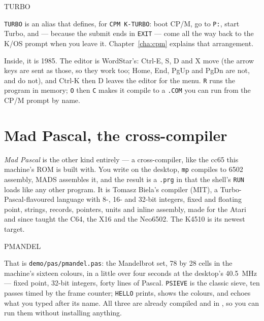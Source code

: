 \begin{type}
TURBO
\end{type}

\noindent \verb|TURBO| is an alias that 
defines, for \verb|CPM K-TURBO|: boot CP/M, go to \verb|P:|, start Turbo,
and --- because the submit ends in \verb|EXIT| --- come all the way back
to the K/OS prompt when you leave it. Chapter~\ref{cha:cpm} explains
that arrangement.


Inside, it is 1985. The editor is WordStar's: Ctrl-E, S, D and X move
(the arrow keys are sent as those, so they work too; Home, End, PgUp and
PgDn are not, and do not), and Ctrl-K then D leaves the editor for the
menu. \verb|R| runs the program in memory;
\verb|O| then \verb|C| makes it compile to a \texttt{.COM} you can run
from the CP/M prompt by name.

\section{Mad Pascal, the cross-compiler}
\emph{Mad Pascal} is the other kind entirely --- a cross-compiler, like
the cc65 this machine's ROM is built with. You write on the desktop,
\texttt{mp} compiles to 6502 assembly, MADS assembles it, and the result
is a \texttt{.prg} in  that the shell's \verb|RUN| loads like
any other program. It is Tomasz Biela's compiler (MIT), a
Turbo-Pascal-flavoured language with 8-, 16- and 32-bit integers, fixed
and floating point, strings, records, pointers, units and inline
assembly, made for the Atari and since taught the C64, the X16 and the
Neo6502. The K4510 is its newest target.

\begin{type}
PMANDEL
\end{type}


That is \texttt{demo/pas/pmandel.pas}: the Mandelbrot set, 78 by 28
cells in the machine's sixteen colours, in a little over four seconds
at the desktop's 40.5~MHz --- fixed point, 32-bit integers, forty lines
of Pascal.
\verb|PSIEVE| is the classic sieve, ten passes timed by the frame
counter; \verb|HELLO| prints, shows the colours, and echoes what you
typed after its name. All three are already compiled and in
, so you can run them without installing anything.


